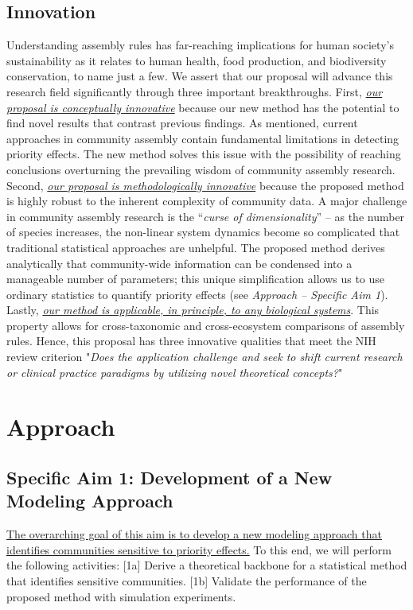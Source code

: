 \documentclass[12pt, class=article, crop=false]{standalone}
\begin{document}
\subsection*{Innovation}
Understanding assembly rules has far-reaching implications for human society's sustainability as it relates to human health, food production, and biodiversity conservation, to name just a few.
We assert that our proposal will advance this research field significantly through three important breakthroughs.
First, \ul{\emph{our proposal is conceptually innovative}} because our new method has the potential to find novel results that contrast previous findings.
As mentioned, current approaches in community assembly contain fundamental limitations in detecting priority effects.
The new method solves this issue with the possibility of reaching conclusions overturning the prevailing wisdom of community assembly research.
Second, \ul{\emph{our proposal is methodologically innovative}} because the proposed method is highly robust to the inherent complexity of community data.
A major challenge in community assembly research is the ``\textit{curse of dimensionality}'' -- as the number of species increases, the non-linear system dynamics become so complicated that traditional statistical approaches are unhelpful.
The proposed method derives analytically that community-wide information can be condensed into a manageable number of parameters; this unique simplification allows us to use ordinary statistics to quantify priority effects (see \textit{Approach -- Specific Aim 1}).
Lastly, \ul{\emph{our method is applicable, in principle, to any biological systems}}.
This property allows for cross-taxonomic and cross-ecosystem comparisons of assembly rules.
Hence, this proposal has three innovative qualities that meet the NIH review criterion "\emph{Does the application challenge and seek to shift current research or clinical practice paradigms by utilizing novel theoretical concepts?}"

\section{Approach}

\subsection*{Specific Aim 1: Development of a New Modeling Approach}

\ul{The overarching goal of this aim is to develop a new modeling approach that identifies communities sensitive to priority effects.}
To this end, we will perform the following activities:
[1a] Derive a theoretical backbone for a statistical method that identifies sensitive communities.
[1b] Validate the performance of the proposed method with simulation experiments.
\end{document}
